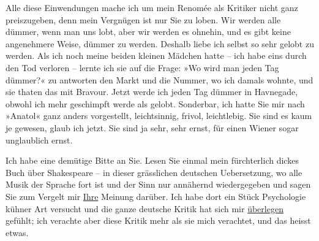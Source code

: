 \pstart
           Alle diese Einwendungen mache ich um mein Renomée als Kritiker nicht ganz
               preiszugeben, denn mein Vergnügen ist nur Sie zu loben. Wir werden alle dümmer, wenn
               man uns lobt, aber wir werden es ohnehin, und es gibt keine angenehmere Weise, dümmer
               zu werden. Deshalb liebe ich selbst so sehr gelobt zu werden. Als ich noch meine
               beiden kleinen Mädchen hatte – {\pb}ich habe
                  eins durch den Tod
               verloren – lernte ich sie auf die Frage: »Wo wird man jeden Tag dümmer?« zu antworten
               den Markt und die Nummer, wo ich damals wohnte, und sie thaten das mit Bravour. Jetzt
               werde ich jeden Tag dümmer in Havnegade, obwohl
               ich mehr geschimpft werde als gelobt. Sonderbar, ich hatte Sie mir nach »Anatol« ganz anders vorgestellt, leichtsinnig,
               frivol, leichtlebig. Sie sind es kaum je gewesen, glaub ich jetzt. Sie sind ja sehr,
               sehr ernst, für einen Wiener sogar unglaublich
               ernst.\pend
           
\pstart
           Ich habe eine demütige Bitte an Sie. Lesen Sie einmal mein fürchterlich dickes Buch über Shakespeare – in dieser grässlichen deutschen Uebersetzung, wo
               alle Musik der Sprache fort ist und der Sinn nur annähernd wiedergegeben und sagen
               Sie zum Vergelt mir \uline{Ihre} Meinung darüber. Ich habe
               dort ein Stück Psychologie kühner Art versucht und die ganze deutsche Kritik hat sich
               mir \uline{überlegen} gefühlt; ich verachte aber diese Kritik
               mehr als sie mich verachtet, und das heisst etwas.\pend
           
